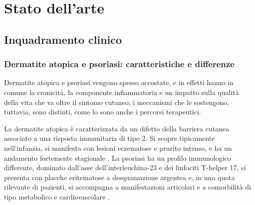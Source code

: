 \chapter{Stato dell'arte}\label{ch:stato-arte}

\section{Inquadramento clinico}\label{sec:inquadramento-clinico}

\subsection{Dermatite atopica e psoriasi: caratteristiche e differenze}\label{subsec:dermatite-psoriasi}

Dermatite atopica e psoriasi vengono spesso accostate, e in effetti hanno in comune la cronicità, la componente infiammatoria e
un impatto sulla qualità della vita che va oltre il sintomo cutaneo; i meccanismi che le sostengono, tuttavia, sono distinti, come
lo sono anche i percorsi terapeutici.

La dermatite atopica è caratterizzata da un difetto della barriera cutanea associato a una risposta immunitaria di tipo 2.
Si scopre tipicamente nell'infanzia, si manifesta con lesioni eczematose e prurito intenso, e ha un andamento fortemente stagionale \cite{weidingerAD}.
La psoriasi ha un profilo immunologico differente, dominato dall'asse dell'interleuchina-23 e dei linfociti T-helper 17, si presenta
con placche eritematose a desquamazione argentea e, in una quota rilevante di pazienti, si accompagna a manifestazioni articolari
e a comorbilità di tipo metabolico e cardiovascolare \cite{griffithsPsoriasis}.


